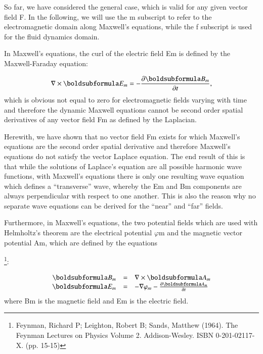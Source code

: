 \documentclass[twoside,final]{article}
\begin{document}
{So far, we have considered the general case, which is valid for any given vector
field F. In the following, we will use the m subscript to refer to the
electromagnetic domain along Maxwell's equations, while the f subscript is used
for the fluid dynamics domain. 

In Maxwell's equations, the curl of the electric field Em is defined by the
Maxwell-Faraday equation:

\begin{equation}
\nabla \times \boldsubformula E_m=-\frac{\partial \boldsubformula B_m}{\partial t},
\end{equation}
which is obvious not equal to zero for electromagnetic fields varying with time
and therefore the dynamic Maxwell equations cannot be second order spatial
derivatives of any vector field Fm as defined by the Laplacian. 

Herewith, we have shown that no vector field Fm exists for which Maxwell's
equations are the second order spatial derivative and therefore Maxwell's
equations do not satisfy the vector Laplace equation. The end result of this is
that while the solutions of Laplace's equation are all possible harmonic wave
functions, with Maxwell's equations there is only one resulting wave equation
which defines a ``transverse'' wave, whereby the Em and Bm components are always
perpendicular with respect to one another. This is also the reason why no
separate wave equations can be derived for the ``near'' and ``far'' fields.

Furthermore, in Maxwell's equations, the two potential fields which are used
with Helmholtz's theorem are the electrical potential $\varphi $m and the
magnetic vector potential Am, which are defined by the equations

\footnote{ Feynman, Richard P; Leighton, Robert B; Sands, Matthew (1964). The
Feynman Lectures on Physics Volume 2. Addison-Wesley. ISBN 0-201-02117-X. (pp.
15-15)\par }:

\begin{equation}
\begin{matrix}\hfill \boldsubformula B_m&=&\nabla \times \boldsubformula A_m\hfill\null \\\hfill \boldsubformula
E_m&=&-\nabla \varphi _m-\frac{\partial \boldsubformula A_m}{\partial t}\hfill\null \end{matrix}
\end{equation}
where Bm is the magnetic field and Em is the electric field.

}
\end{document}
